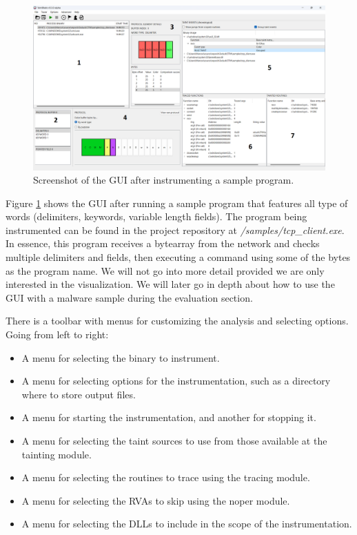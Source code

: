 \documentclass[conference]{IEEEtran}
\begin{document}
\begin{figure}
    \centerline{\includegraphics[width=\textwidth]{images/GUI_full.png}}
    \caption{Screenshot of the GUI after instrumenting a sample program.}
    \label{figure:gui_full}
\end{figure}

Figure \ref{figure:gui_full} shows the GUI after running a sample program that features all type
of words (delimiters, keywords, variable length fields). The program being instrumented can be found in the project
repository at \textit{/samples/tcp\_client.exe}. In essence, this program receives a bytearray
from the network and checks multiple delimiters and fields, then executing a command using
some of the bytes as the program name. We will not go into more detail provided we are only
interested in the visualization. We will later go in depth about how to use the GUI with a
malware sample during the evaluation section.

There is a toolbar with menus for customizing the analysis and selecting options. Going
from left to right:
\begin{itemize}
    \item A menu for selecting the binary to instrument.
    \item A menu for selecting options for the instrumentation, such as a directory 
    where to store output files.
    \item A menu for starting the instrumentation, and another for stopping it.
    \item A menu for selecting the taint sources to use from those available at the tainting module.
    \item A menu for selecting the routines to trace using the tracing module.
    \item A menu for selecting the RVAs to skip using the noper module.
    \item A menu for selecting the DLLs to include in the scope of the instrumentation.
\end{itemize} 
\end{document}
